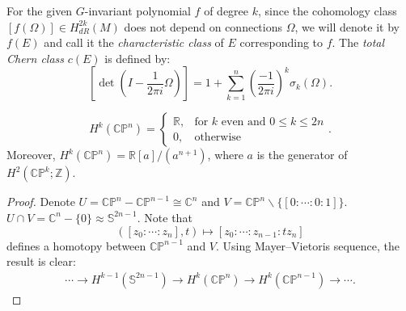 \documentclass[11pt]{homework}
\theoremstyle{indented}
\begin{document}
\begin{definition}
    For the given $G$-invariant polynomial $f$ of degree $k$, since the cohomology class $\left[f(\Omega)\right] \in H_{dR}^{2k}(M)$ does not depend on connections $\Omega$, we will denote it by $f(E)$ and call it the \textit{characteristic class} of $E$ corresponding to $f$. The \textit{total Chern class} $c(E)$ is defined by:
    \begin{equation*}
        \left[\det \left(I - \frac{1}{2\pi i}\Omega\right)\right] = 1 + \sum_{k=1}^n \left(\frac{-1}{2 \pi i}\right)^k \sigma_k (\Omega).
    \end{equation*}
\end{definition}

\begin{remark}
    \begin{equation*}
        H^{k} \left(\mathbb{CP}^n\right) = \begin{cases}
            \mathbb{R},& \text{for } k \text{ even and } 0\leq k \leq 2n\\
            0,              & \text{otherwise}
        \end{cases}.
    \end{equation*}
    Moreover, $H^{k} \left(\mathbb{CP}^n\right) = \mathbb{R}[a] / \left(a^{n+1}\right)$, where $a$ is the generator of $H^2\left(\mathbb{CP}^k; \mathbb{Z}\right)$.
\end{remark}

\begin{proof}
    Denote $U = \mathbb{CP}^n - \mathbb{CP}^{n-1} \cong \mathbb{C}^n$ and $V = \mathbb{CP}^n \backslash \{[0:\cdots:0:1]\}$. $U \cap V = \mathbb{C}^n - \{0\} \approx \mathbb{S}^{2n-1}$. Note that
    \begin{equation*}
        ([z_0:\cdots:z_{n}], t) \mapsto [z_0: \cdots:z_{n-1}: t z_n]
    \end{equation*}
    defines a homotopy between $\mathbb{CP}^{n-1}$ and $V$.
    Using Mayer–Vietoris sequence, the result is clear:
    \begin{align*}
        \cdots \to H^{k-1} \left( \mathbb{S}^{2n-1} \right) \to H^{k} \left(\mathbb{CP}^n \right) \to H^{k} \left( \mathbb{CP}^{n-1} \right) \to \cdots.
    \end{align*}
\end{proof}
\end{document}
